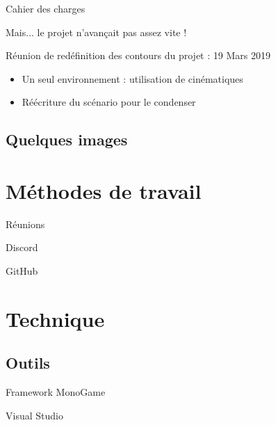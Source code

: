 \documentclass{beamer}
\begin{document}
\begin{frame}{Cahier des charges}

Mais... le projet n'avançait pas assez vite !

\pause
\bigskip
Réunion de redéfinition des contours du projet : 19 Mars 2019

\begin{itemize}
    \item Un seul environnement : utilisation de cinématiques
    \item Réécriture du scénario pour le condenser
\end{itemize}

\end{frame}

\subsection{Quelques images}

\section{Méthodes de travail}

\begin{frame}{Réunions}
  
\end{frame}

\begin{frame}{Discord}
  
\end{frame}

\begin{frame}{GitHub}
  
\end{frame}

\section{Technique}

\subsection{Outils}

\begin{frame}{Framework MonoGame}
  
\end{frame}

\begin{frame}{Visual Studio}
  
\end{frame}
\end{document}
